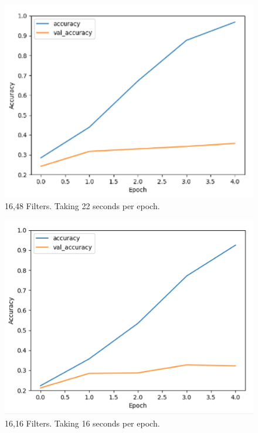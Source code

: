 \begin{figure}[H]
\centering
\includegraphics[scale=1.0]{Media/Testing/fig9.png}
\caption{16,48 Filters. Taking 22 seconds per epoch.}
\label{fig9}
\end{figure}

\begin{figure}[H]
\centering
\includegraphics[scale=1.0]{Media/Testing/fig10.png}
\caption{16,16 Filters. Taking 16 seconds per epoch.}
\label{fig10}
\end{figure}

